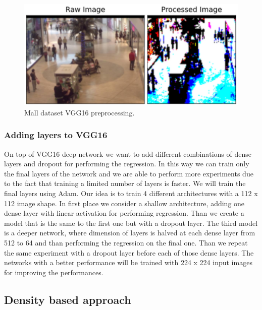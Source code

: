 \documentclass[10pt,twocolumn,letterpaper]{article}
\begin{document}
\begin{figure}[h!]%
	\includegraphics[width=0.9\columnwidth]{pics/preprocess.png}
	\centering
	\caption{Mall dataset VGG16 preprocessing.}
	\centering
	\label{fig:preprocess}
\end{figure}

\subsubsection{Adding layers to VGG16 }

On top of VGG16 deep network we want to add different combinations of dense layers and dropout for performing the regression. In this way we can train only the final layers of the network and we are able to perform more experiments due to the fact that training a limited number of layers is faster. We will train the final layers using Adam. Our idea is to train 4 different architectures with a 112 x 112 image shape. In first place we consider a shallow architecture, adding one dense layer with linear activation for performing regression. Than we create a model that is the same to the first one but with a dropout layer. The third model is a deeper network, where dimension of layers is halved at each dense layer from 512 to 64 and than performing the regression on the final one. Than we repeat the same experiment with a dropout layer before each of those dense layers. The networks with a better performance will be trained with 224 x 224 input images for improving the performances. 

\subsection{Density based approach}
\end{document}
